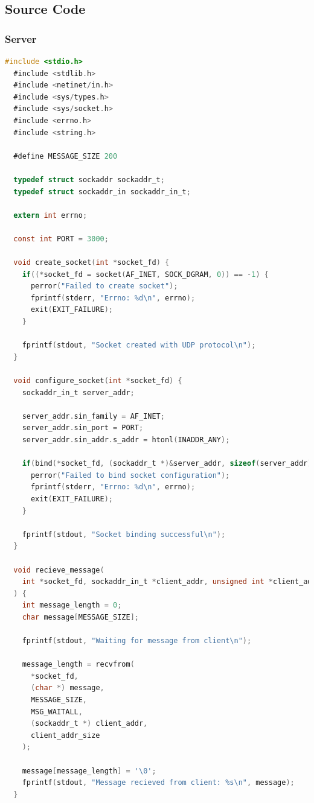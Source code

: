 \subsection{Source Code}
\subsubsection{Server}
\begin{lstlisting}[language=C]
  #include <stdio.h>
  #include <stdlib.h>
  #include <netinet/in.h>
  #include <sys/types.h>
  #include <sys/socket.h>
  #include <errno.h>
  #include <string.h>
  
  #define MESSAGE_SIZE 200
  
  typedef struct sockaddr sockaddr_t;
  typedef struct sockaddr_in sockaddr_in_t;
  
  extern int errno;
  
  const int PORT = 3000;
  
  void create_socket(int *socket_fd) {
    if((*socket_fd = socket(AF_INET, SOCK_DGRAM, 0)) == -1) {
      perror("Failed to create socket");
      fprintf(stderr, "Errno: %d\n", errno);
      exit(EXIT_FAILURE);
    }
  
    fprintf(stdout, "Socket created with UDP protocol\n");
  }
  
  void configure_socket(int *socket_fd) {
    sockaddr_in_t server_addr;
  
    server_addr.sin_family = AF_INET;
    server_addr.sin_port = PORT;
    server_addr.sin_addr.s_addr = htonl(INADDR_ANY);
  
    if(bind(*socket_fd, (sockaddr_t *)&server_addr, sizeof(server_addr)) == -1) {
      perror("Failed to bind socket configuration");
      fprintf(stderr, "Errno: %d\n", errno);
      exit(EXIT_FAILURE);
    }
  
    fprintf(stdout, "Socket binding successful\n");
  }
  
  void recieve_message(
    int *socket_fd, sockaddr_in_t *client_addr, unsigned int *client_addr_size
  ) {
    int message_length = 0;
    char message[MESSAGE_SIZE];
  
    fprintf(stdout, "Waiting for message from client\n");
  
    message_length = recvfrom(
      *socket_fd,
      (char *) message,
      MESSAGE_SIZE,
      MSG_WAITALL,
      (sockaddr_t *) client_addr,
      client_addr_size
    );
  
    message[message_length] = '\0';
    fprintf(stdout, "Message recieved from client: %s\n", message);
  }
  

\end{lstlisting}
